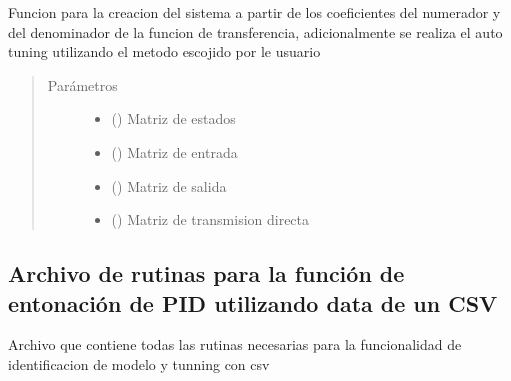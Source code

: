 \documentclass[letterpaper,10pt,spanish]{sphinxmanual}
\begin{document}
\begin{fulllineitems}
\label{\detokenize{codigos/rutinas_PID:rutinas_PID.system_creator_tf_tuning}}
Funcion para la creacion del sistema a partir de los coeficientes del numerador y del denominador de la funcion de transferencia, adicionalmente se realiza el auto tuning utilizando el metodo escojido por le usuario
\begin{quote}\begin{description}
\item[{Parámetros}] \leavevmode\begin{itemize}
\item {} 
 () \textendash{} Matriz de estados

\item {} 
 () \textendash{} Matriz de entrada

\item {} 
 () \textendash{} Matriz de salida

\item {} 
 () \textendash{} Matriz de transmision directa

\end{itemize}

\end{description}\end{quote}

\end{fulllineitems}



\subsection{Archivo de rutinas para la función de entonación de PID utilizando data de un CSV}
\label{\detokenize{codigos/rutinas_CSV:module-rutinas_CSV}}\label{\detokenize{codigos/rutinas_CSV:archivo-de-rutinas-para-la-funcion-de-entonacion-de-pid-utilizando-data-de-un-csv}}\label{\detokenize{codigos/rutinas_CSV::doc}}
Archivo que contiene todas las rutinas necesarias para la funcionalidad de identificacion de modelo y tunning con csv
\end{document}
